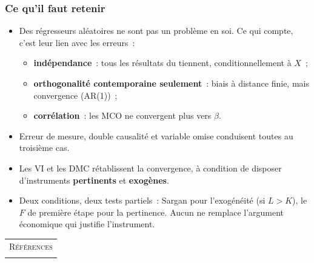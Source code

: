 \documentclass[10pt]{beamer}
\begin{document}
\begin{frame}
  \frametitle{Ce qu'il faut retenir}

  \begin{itemize}

  \item Des régresseurs aléatoires ne sont pas un problème en soi. Ce qui
    compte, c'est leur lien avec les erreurs~:
    \begin{itemize}
    \item \textbf{indépendance}~: tous les résultats du  tiennent,
      conditionnellement à $X$~;
    \item \textbf{orthogonalité contemporaine seulement}~: biais à distance
      finie, mais convergence (AR(1))~;
    \item \textbf{corrélation}~: les MCO ne convergent plus vers $\beta$.
    \end{itemize}

  \item Erreur de mesure, double causalité et variable omise conduisent toutes
    au troisième cas.\newline

  \item Les VI et les DMC rétablissent la convergence, à condition de disposer
    d'instruments \textbf{pertinents} et \textbf{exogènes}.\newline

  \item[\dbend] Deux conditions, deux tests partiels~: Sargan pour l'exogénéité
    (si $L>K$), le $F$ de première étape pour la pertinence. Aucun ne remplace
    l'argument économique qui justifie l'instrument.

  \end{itemize}

\end{frame}


\begin{notes}

  \begin{center}
    \begin{tabular}{c}
      \\
      \Huge{\textsc{Références}}\\
      \\
    \end{tabular}
  \end{center}

  \bigskip

  \nocite{Greene2017}

  \nocite{Schmidt1976}

  \printbibliography

\end{notes}
\end{document}
